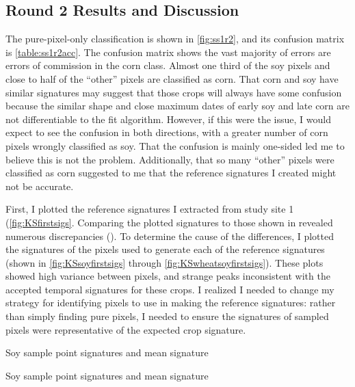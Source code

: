 \subsection*{Round 2 Results and Discussion}

The pure-pixel-only classification is shown in \autoref{fig:ss1r2}, and its confusion matrix is \autoref{table:ss1r2acc}. The confusion matrix shows the vast majority of errors are errors of commission in the corn class. Almost one third of the soy pixels and close to half of the “other” pixels are classified as corn. That corn and soy have similar signatures may suggest that those crops will always have some confusion because the similar shape and close maximum dates of early soy and late corn are not differentiable to the fit algorithm. However, if this were the issue, I would expect to see the confusion in both directions, with a greater number of corn pixels wrongly classified as soy. That the confusion is mainly one-sided led me to believe this is not the problem. Additionally, that so many “other” pixels were classified as corn suggested to me that the reference signatures I created might not be accurate.

First, I plotted the reference signatures I extracted from study site 1 (\autoref{fig:KSfirstsigs}. Comparing the plotted signatures to those shown in \citeauthor{wardlow2005state-level} revealed numerous discrepancies \mkbibparens{\citeyear{wardlow2005state-level}}. To determine the cause of the differences, I plotted the signatures of the pixels used to generate each of the reference signatures (shown in \autoref{fig:KSsoyfirstsigs} through \autoref{fig:KSwheatsoyfirstsigs}). These plots showed high variance between pixels, and strange peaks inconsistent with the accepted temporal signatures for these crops.  I realized I needed to change my strategy for identifying pixels to use in making the reference signatures: rather than simply finding pure pixels, I needed to ensure the signatures of sampled pixels were representative of the expected crop signature.

\begin{ssfigure}
  \centering
  
  \caption{Soy sample point signatures and mean signature}
    \label{fig:KSfirstsigs}
\end{ssfigure}

\begin{ssfigure}
  \centering
  
  \caption{Soy sample point signatures and mean signature}
    \label{fig:KSsoyfirstsigs}
\end{ssfigure}

